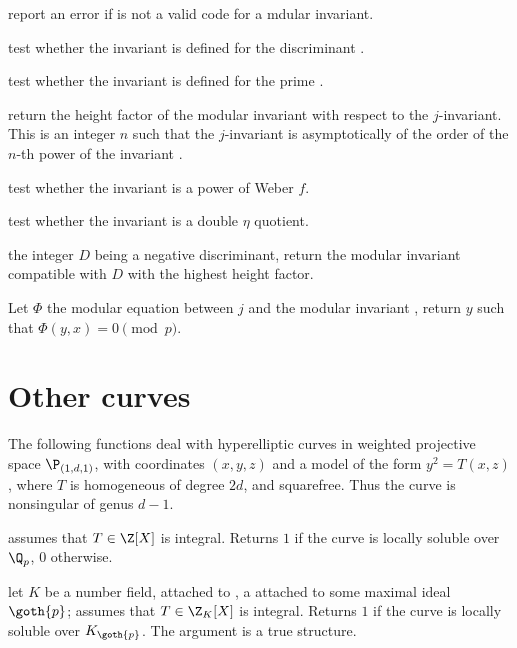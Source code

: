 
 report an error if  is not a
valid code for a mdular invariant.

 test whether the
invariant  is defined for the discriminant .

 test whether the
invariant  is defined for the prime .

 return the height factor
of the modular invariant  with respect to the $j$-invariant.
This is an integer $n$ such that the $j$-invariant is asymptotically
of the order of the $n$-th power of the invariant .

 test whether the invariant
 is a power of Weber $f$.

 test whether the invariant
 is a double $\eta$ quotient.

 the integer $D$ being a negative discriminant,
return the modular invariant compatible with $D$ with the highest height
factor.

 Let $\Phi$ the modular equation
between $j$ and the modular invariant , return $y$ such that
$\Phi(y,x)=0\pmod{p}$.

\section{Other curves}

The following functions deal with hyperelliptic curves in weighted projective
space $\P_{(1,d,1)}$, with coordinates $(x,y,z)$ and a model of the form
$ y^2 = T(x,z)$, where $T$ is homogeneous of degree $2d$, and squarefree.
Thus the curve is nonsingular of genus $d-1$.

 assumes that $T\in\Z[X]$ is
integral. Returns $1$ if the curve is locally soluble over $\Q_p$, $0$
otherwise.

 let $K$
be a number field, attached to ,  a  attached
to some maximal ideal $\goth{p}$; assumes that $T\in\Z_K[X]$ is integral.
Returns $1$ if the curve is locally soluble over $K_{\goth{p}}$. The argument
 is a true  structure.

\newpage
